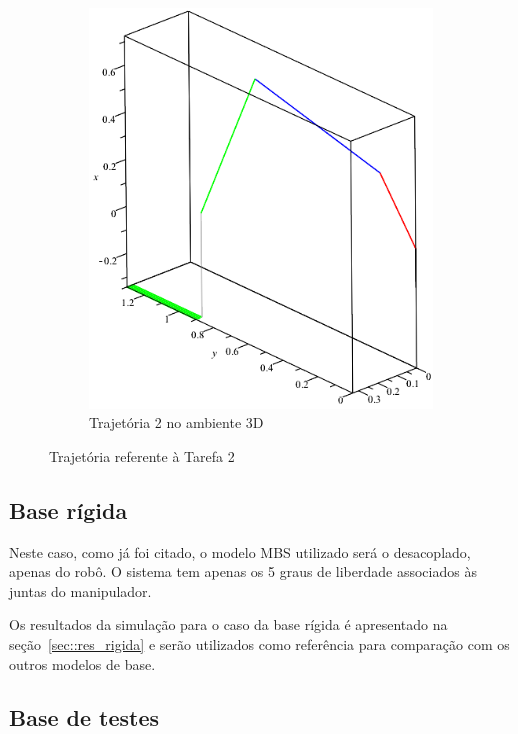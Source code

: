 \begin{figure}[h]
\begin{subfigure}[b]{0.4\textwidth}
        \includegraphics[width=\textwidth]{figs/traj2_3d}
        \caption{Trajetória 2 no ambiente 3D}
        \label{fig::traj2_3d}
    \end{subfigure}
    \caption{Trajetória referente à Tarefa 2}
    \label{fig::traj2_subf}
\end{figure}


\subsection{Base rígida}

Neste caso, como já foi citado, o modelo MBS utilizado será o desacoplado,
apenas do robô. O sistema tem apenas os 5 graus de liberdade associados às juntas do
manipulador.

Os resultados da simulação para o caso da base rígida é apresentado na
seção~\ref{sec::res_rigida} e serão utilizados como referência para comparação
com os outros modelos de base.


\subsection{Base de testes}

